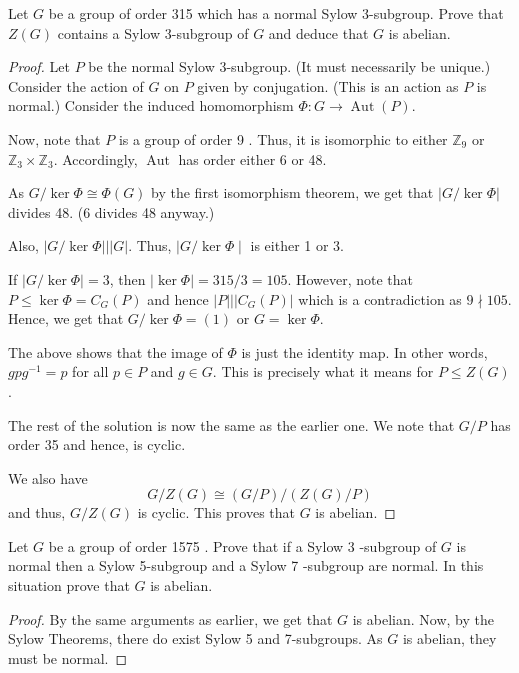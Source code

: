 \begin{exercise}
Let $G$ be a group of order 315 which has a normal Sylow 3-subgroup. Prove that $Z(G)$ contains a Sylow 3-subgroup of $G$ and deduce that $G$ is abelian.
\end{exercise}
\begin{proof}
Let $P$ be the normal Sylow 3-subgroup. (It must necessarily be unique.) Consider the action of $G$ on $P$ given by conjugation. (This is an action as $P$ is normal.) Consider the induced homomorphism $\Phi: G \rightarrow \operatorname{Aut}(P)$.

Now, note that $P$ is a group of order 9 . Thus, it is isomorphic to either $\mathbb{Z}_9$ or $\mathbb{Z}_3 \times \mathbb{Z}_3$. Accordingly, $\operatorname{Aut}$ has order either 6 or 48.

As $G / \operatorname{ker} \Phi \cong \Phi(G)$ by the first isomorphism theorem, we get that $|G / \operatorname{ker} \Phi|$ divides 48. (6 divides 48 anyway.)

Also, $|G / \operatorname{ker} \Phi|||G|$. Thus, $| G / \operatorname{ker} \Phi \mid$ is either 1 or 3.

If $|G / \operatorname{ker} \Phi|=3$, then $|\operatorname{ker} \Phi|=315 / 3=105$. However, note that $P \leq \operatorname{ker} \Phi=C_G(P)$ and hence $|P|\left|\left|C_G(P)\right|\right.$ which is a contradiction as $9 \nmid  105$. Hence, we get that $G / \operatorname{ker} \Phi=(1)$ or $G=\operatorname{ker} \Phi$.

The above shows that the image of $\Phi$ is just the identity map. In other words, $g p g^{-1}=p$ for all $p \in P$ and $g \in G$. This is precisely what it means for $P \leq Z(G)$.

The rest of the solution is now the same as the earlier one. We note that $G / P$ has order 35 and hence, is cyclic.

We also have
\[
G / Z(G) \cong(G / P) /(Z(G) / P)
\]
and thus, $G / Z(G)$ is cyclic. This proves that $G$ is abelian.
\end{proof}

\begin{exercise}
Let $G$ be a group of order 1575 . Prove that if a Sylow 3 -subgroup of $G$ is normal then a Sylow 5-subgroup and a Sylow 7 -subgroup are normal. In this situation prove that $G$ is abelian.
\end{exercise}
\begin{proof}
By the same arguments as earlier, we get that $G$ is abelian. Now, by the Sylow Theorems, there do exist Sylow 5 and 7-subgroups. As $G$ is abelian, they must be normal.
\end{proof}

